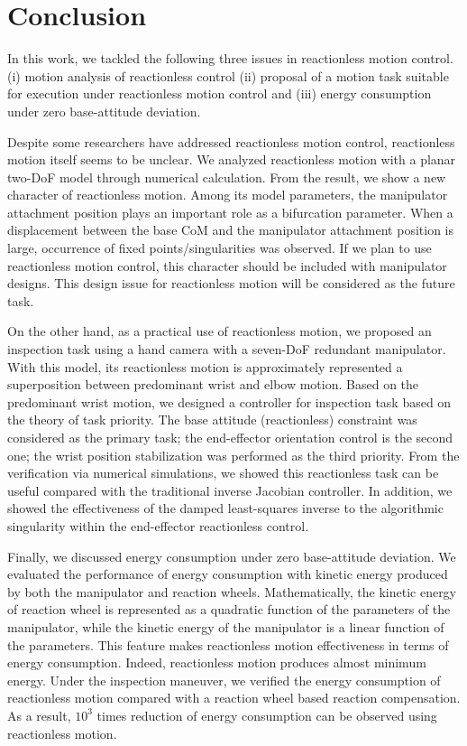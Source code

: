 \documentclass[preprint,12pt]{elsarticle}
\begin{document}
\section{Conclusion}
\label{sec:CON}
In this work, we tackled the following three issues in reactionless motion control.
(i) motion analysis of reactionless control
(ii) proposal of a motion task suitable for execution under reactionless motion control
and
(iii) energy consumption under zero base-attitude deviation.

Despite some researchers have addressed reactionless motion control,
reactionless motion itself seems to be unclear.
We analyzed reactionless motion with a planar two-DoF model through numerical calculation.
From the result, we show a new character of reactionless motion.
Among its model parameters, the manipulator attachment position plays an important role as
a bifurcation parameter.
When a displacement between the base CoM and the manipulator attachment position is large,
occurrence of fixed points/singularities was observed.
If we plan to use reactionless motion control,
this character should be included with manipulator designs.
This design issue for reactionless motion will be considered as the future task.

On the other hand,
as a practical use of reactionless motion,
we proposed an inspection task using a hand camera with a seven-DoF redundant manipulator.
With this model, its reactionless motion is approximately represented a superposition between
predominant wrist and elbow motion.
Based on the predominant wrist motion,
we designed a controller for inspection task based on the theory of task priority.
The base attitude (reactionless) constraint was considered as the primary task;
the end-effector orientation control is the second one;
the wrist position stabilization was performed as the third priority.
From the verification via numerical simulations,
we showed this reactionless task can be useful compared with the traditional inverse Jacobian controller.
In addition,
we showed the effectiveness of the damped least-squares inverse to the algorithmic singularity within
the end-effector reactionless control.

Finally, we discussed energy consumption under zero base-attitude deviation.
We evaluated the performance of energy consumption with kinetic energy produced by
both the manipulator and reaction wheels.
Mathematically, the kinetic energy of reaction wheel is represented as
a quadratic function of the parameters of the manipulator,
while the kinetic energy of the manipulator is a linear function of the parameters.
This feature makes reactionless motion effectiveness in terms of energy consumption.
Indeed, reactionless motion produces almost minimum energy.
Under the inspection maneuver, we verified the energy consumption of reactionless motion
compared with a reaction wheel based reaction compensation.
As a result,
$10^{3}$ times reduction of energy consumption can be observed using reactionless motion.




\end{document}
